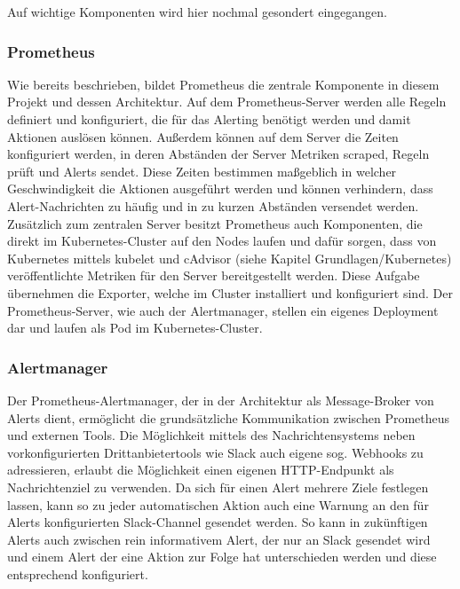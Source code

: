 \documentclass[a4paper,10pt]{scrartcl}
\begin{document}
Auf wichtige Komponenten wird hier nochmal gesondert eingegangen.

\subsubsection{Prometheus}

Wie bereits beschrieben, bildet Prometheus die zentrale Komponente in diesem Projekt und dessen Architektur. Auf dem Prometheus-Server werden alle Regeln definiert und konfiguriert, die für das Alerting benötigt werden und damit Aktionen auslösen können. Außerdem können auf dem Server die Zeiten konfiguriert werden, in deren Abständen der Server Metriken scraped, Regeln prüft und Alerts sendet. Diese Zeiten bestimmen maßgeblich in welcher Geschwindigkeit die Aktionen ausgeführt werden und können verhindern, dass Alert-Nachrichten zu häufig und in zu kurzen Abständen versendet werden.\\

Zusätzlich zum zentralen Server besitzt Prometheus auch Komponenten, die direkt im Kubernetes-Cluster auf den Nodes laufen und dafür sorgen, dass von Kubernetes mittels kubelet und cAdvisor (siehe Kapitel Grundlagen/Kubernetes) veröffentlichte Metriken für den Server bereitgestellt werden. Diese Aufgabe übernehmen die Exporter, welche im Cluster installiert und konfiguriert sind.
Der Prometheus-Server, wie auch der Alertmanager, stellen ein eigenes Deployment dar und laufen als Pod im Kubernetes-Cluster. 

\subsubsection{Alertmanager}

Der Prometheus-Alertmanager, der in der Architektur als Message-Broker von Alerts dient, ermöglicht die grundsätzliche Kommunikation zwischen Prometheus und externen Tools. Die Möglichkeit mittels des Nachrichtensystems neben vorkonfigurierten Drittanbietertools wie Slack auch eigene sog. Webhooks zu adressieren, erlaubt die Möglichkeit einen eigenen HTTP-Endpunkt als Nachrichtenziel zu verwenden. Da sich für einen Alert mehrere Ziele festlegen lassen, kann so zu jeder automatischen Aktion auch eine Warnung an den für Alerts konfigurierten Slack-Channel gesendet werden. So kann in zukünftigen Alerts auch zwischen rein informativem Alert, der nur an Slack gesendet wird und einem Alert der eine Aktion zur Folge hat unterschieden werden und diese entsprechend konfiguriert.\\
\end{document}
